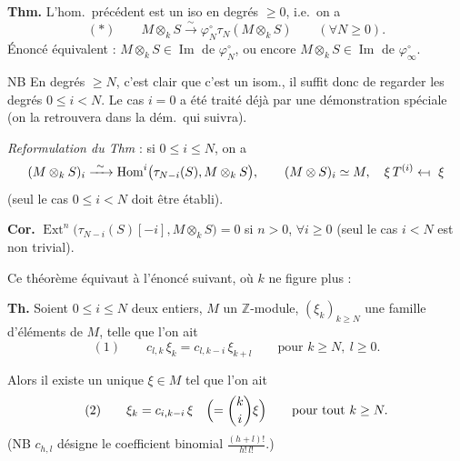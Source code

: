 \documentclass[11pt,a4paper]{article}
\begin{document}
\textbf{Thm.} L'hom.\ précédent est un iso en degrés $\geq 0$, i.e.\ on a
\[
  (*) \qquad M \otimes_k S \xrightarrow{\ \sim\ } \varphi^{\circ}_N \tau_N (M \otimes_k S)
  \qquad (\forall N \geq 0) .
\]
Énoncé équivalent : $M \otimes_k S \in \operatorname{Im}$ de $\varphi^{\circ}_N$,
ou encore $M \otimes_k S \in \operatorname{Im}$ de $\varphi^{\circ}_{\infty}$.

NB En degrés $\geq N$, c'est clair que c'est un isom., il suffit donc de regarder les degrés
$0 \leq i < N$. Le cas $i = 0$ a été traité déjà par une démonstration spéciale (on la
retrouvera dans la dém.\ qui suivra).

\emph{Reformulation du Thm} : si $0 \leq i \leq N$, on a
\[
  (M \otimes_k S)_i \xrightarrow{\ \sim\ }
  \operatorname{Hom}^i\bigl(\tau_{N-i}(S), M \otimes_k S\bigr) ,
  \qquad (M \otimes S)_i \simeq M ,\quad \xi\, T^{(i)} \leftarrow\!\shortmid\ \xi
\]
(seul le cas $0 \leq i < N$ doit être établi).

\textbf{Cor.}
$\operatorname{Ext}^n\bigl(\tau_{N-i}(S)[-i], M \otimes_k S\bigr) = 0$ si $n > 0$,
$\forall i \geq 0$ (seul le cas $i < N$ est non trivial).

Ce théorème équivaut à l'énoncé suivant, où $k$ ne figure plus :

\textbf{Th.} Soient $0 \leq i \leq N$ deux entiers, $M$ un $\mathbb{Z}$-module,
$(\xi_k)_{k \geq N}$ une famille d'éléments de $M$, telle que l'on ait
\[
  (1) \qquad c_{l,k}\, \xi_k = c_{l, k-i}\, \xi_{k+l} \qquad \text{pour } k \geq N,\ l \geq 0 .
\]

Alors il existe un unique $\xi \in M$ tel que l'on ait
\[
  (2) \qquad \xi_k = c_{i, k-i}\, \xi \quad \Bigl(= \binom{k}{i} \xi\Bigr)
  \qquad \text{pour tout } k \geq N .
\]
(NB $c_{h,l}$ désigne le coefficient binomial $\frac{(h+l)!}{h!\,l!}$.)
\end{document}
